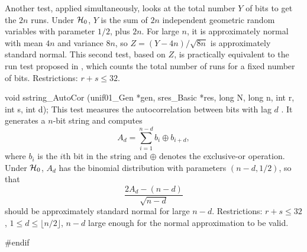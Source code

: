   Another test, applied simultaneously, looks at the total number
  $Y$ of bits to get the $2n$ runs.  Under $\cH_0$, $Y$ is the sum of
  $2n$ independent geometric random variables with parameter $1/2$,
  plus $2n$.  For large $n$, it is approximately normal with mean
  $4n$ and variance $8n$, so $Z = (Y - 4n)/\sqrt{8n}$ is approximately
  standard normal.  This second test, based on $Z$, is practically
  equivalent to the run test proposed in \cite{rRUK01a}, which counts
  the total number of runs for a fixed number of bits.
  Restrictions: $r + s \le 32$.
\endtab
\iffalse  %
 \tab  This test, taken from \cite{rRUK01a}, considers whether the runs of 
  0's and 1's in a sequence of bits is as expected for a random sequence.
 \index{Test!Run!bits}%
  A run of length $\ell$ is an uninterrupted sequence of 
  $\ell$ identical bits, preceded and followed by a bit of opposite value.
  The test decomposes a sequence of $n$ bits into runs of identical bits 
  and counts the total number of runs $R$.

  Under $\cH_0$, the standardized test statistic 
$$
  Z = \frac{R - 2nf_1(1 - f_1)}{2\sqrt n f_1(1 - f_1)},
$$
 where $f_1$ is the proportion of 1's amongst the $n$ bits, 
 has the standard normal distribution in the limit as $n\to\infty$
 (see \cite{rRUK01a} for a reference).
 The test compares the value of $Z$ to the standard normal.
 Restrictions: $r + s \le 32$.
 Recommendation: $100 \le n$.
\endtab
\fi  %
\code


void sstring_AutoCor (unif01_Gen *gen, sres_Basic *res,
                      long N, long n, int r, int s, int d);
\endcode
 \tab 
 This test measures the autocorrelation between bits with lag $d$ \cite{rERD92a}.
 It generates a $n$-bit string and computes
$$
  A_d = \sum_{i=1}^{n-d} b_i \oplus b_{i+d},
$$
  where $b_i$ is the $i$th bit in the string and
  $\oplus$ denotes the exclusive-or operation. 
  Under $\cH_0$, $A_d$ has the binomial distribution 
  with parameters $(n-d, 1/2)$, so that 
$$
  \frac{2 A_d - (n-d)}{\sqrt{n-d}}
$$
  should be approximately standard normal for large $n-d$.
  Restrictions: $r + s \le 32$, $1 \le d \le \lfloor n/2 \rfloor$, $n-d$ 
  large enough for the normal approximation to be valid.
 \endtab 
\code

\hide
#endif
\endhide
\endcode
